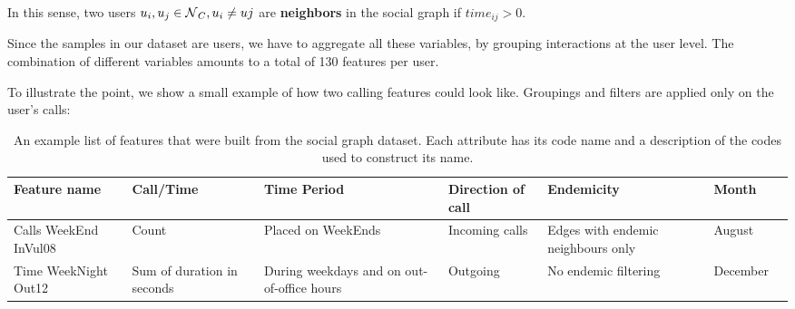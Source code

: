 In this sense, two users $u_i, u_j \in \operatorname{\mathcal{N}}_C, u_i \neq uj$ are \textbf{neighbors} in the social graph if $time_{ij} > 0$.



Since the samples in our dataset are users, we have to aggregate all these variables, by grouping interactions at the user level.
The combination of different variables amounts to a total of 130 features per user.

To illustrate the point, we show a small example of how two calling features could look like.
Groupings and filters are applied only on the user's calls:

\begin{table}[ht]
	\caption{An example list of features that were built from the social graph dataset.
Each attribute has its code name and a description of the codes used to construct its name.}\label{tab:data_example}
	\footnotesize
	\centering
	\begin{tabular} {|p{1.5cm}|p{1.5cm}|p{2cm}|p{1.5cm}|p{2cm}|p{1.5cm}|p{1cm}}
		\hline
		Feature name & Call/Time & Time Period & Direction of call & Endemicity & Month \\
		\hline
		Calls WeekEnd InVul08       & Count & Placed on WeekEnds & Incoming calls & Edges with endemic neighbours only & August\\
		\hline
		Time WeekNight Out12 & Sum of duration in seconds & During weekdays and on out-of-office hours & Outgoing   & No endemic filtering   & December \\
		\hline
	\end{tabular}
\end{table}


